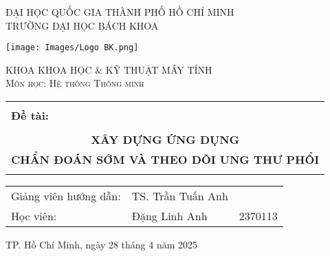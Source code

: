 \documentclass[12pt, a4paper]{article}
\begin{document}
\begin{titlepage}

        
	\centering
	
	{\scshape\large ĐẠI HỌC QUỐC GIA THÀNH PHỐ HỒ CHÍ MINH\\TRƯỜNG ĐẠI HỌC BÁCH KHOA \par}
	\vspace{0.5cm}
	\texttt{[image: Images/Logo BK.png]}\par\vspace{0.1 cm}
	{\scshape\large KHOA KHOA HỌC \& KỸ THUẬT MÁY TÍNH \\
	                Môn học: Hệ thống Thông minh\par} %
	\vspace{1.5cm}

	\begin{center}
	    \color{blue}
	    \begin{tabular}{c}
	    \hline
	    \\
	    \multicolumn{1}{l}{\large \bfseries Đề tài:}\\
	    \\
	    \Large \bfseries XÂY DỰNG ỨNG DỤNG \\ %
        \Large \bfseries CHẨN ĐOÁN SỚM VÀ THEO DÕI UNG THƯ PHỔI \\ %
	    \\
	    \hline
	    \end{tabular}
	\end{center}

	\vspace{1cm}
	\begin{center}
	    \large 
	    \begin{tabular}{l l l}
	        Giảng viên hướng dẫn:   &  TS. Trần Tuấn Anh &\\
	        Học viên:   &  Đặng Linh Anh & 2370113\\
	    \end{tabular}
	    
	\end{center}
    \vspace{1.5cm}
	\vfill
	{ TP. Hồ Chí Minh, ngày 28 tháng 4 năm 2025 } %
\end{titlepage}
\end{document}
